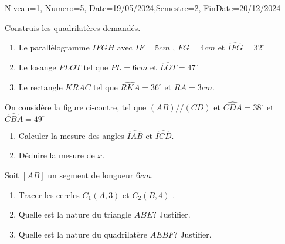\documentclass[a4paper,12pt]{article}
\begin{document}
\begin{Maquette}[DM]{Niveau=1, Numero=5, Date=19/05/2024,Semestre=2, FinDate=20/12/2024}
\begin{exercice}
\begin{minipage}{.4\linewidth}
\begin{tikzpicture}
\end{tikzpicture}
\end{minipage}

\end{exercice}

\begin{exercice}
Construis les quadrilatères demandés.
\begin{enumerate}
\item Le parallélogramme $IFGH$ avec $IF=5cm$ , $FG=4cm$ et $\widehat{IFG}=32^{\circ}$
\item Le losange $PLOT$ tel que $PL=6cm$ et $\widehat{LOT}=47^{\circ}$
\item Le rectangle $KRAC$ tel que $\widehat{RKA}=36^{\circ}$ et $RA=3cm$.
\end{enumerate}
\end{exercice}

\begin{exercice}
\begin{minipage}{.58\linewidth}
On considère la figure ci-contre, tel que $(AB)//(CD)$  et $\widehat{CDA}=38^{\circ}$ et $\widehat{CBA}=49^{\circ}$
\begin{enumerate}
\item Calculer la mesure des angles $\widehat{IAB}$ et $\widehat{ICD}$.
\item Déduire la mesure de $x$.
\end{enumerate}
\end{minipage}%
\begin{minipage}{.40\linewidth}
\end{minipage}

\end{exercice}

\begin{exercice}
Soit $[AB]$ un segment de longueur $6cm$.
\begin{enumerate}
\item Tracer les cercles $C_1(A,3)$ et $C_2(B,4)$ .
\item Quelle est la nature du triangle $ABE$? Justifier.
\item Quelle est la nature du quadrilatère $AEBF$? Justifier.
\end{enumerate}
\end{exercice}


\end{Maquette}
\end{document}
